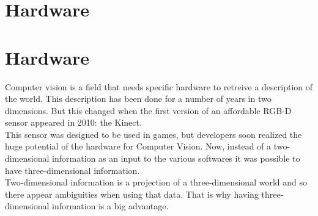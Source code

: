 \chapter*{Hardware}


\chapter*{Hardware}

Computer vision is a field that needs specific hardware to retreive a description of the world. This description has been done for a number of years in two dimensions. But this changed when the first version of an affordable RGB-D sensor appeared in 2010: the Kinect.
\\

This sensor was designed to be used in games, but developers soon realized the huge potential of the hardware for Computer Vision.  
Now, instead of a two-dimensional information as an input to the various softwares it was possible to have three-dimensional information. 
\\

Two-dimensional information is a projection of a three-dimensional world and so there appear ambiguities when using that data. That is why having three-dimensional information is a big advantage. 
\\


